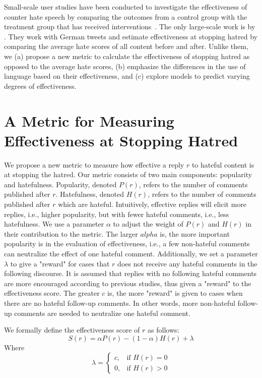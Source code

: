 \documentclass[11pt]{article}
\begin{document}
Small-scale user studies have been conducted to investigate the effectiveness of counter hate speech by comparing the outcomes from a control group with the treatment group that has received interventions~\cite{munger2017tweetment,hangartner2021empathy,bilewicz2021artificial}. 
The only large-scale work is by \citet{garland2022impact}.
They work with German tweets and estimate effectiveness at stopping hatred by comparing the 
average hate scores of all content before and after.
Unlike them, 
we 
(a) propose a new metric to calculate the effectiveness of stopping hatred as opposed to the average hate scores, 
(b) emphasize the differences in the use of language based on their effectiveness,
and
(c) explore models to predict varying degrees of effectiveness. 


\section{A Metric for Measuring Effectiveness at Stopping Hatred} %
\label{s:metric}
We propose a new metric to measure how effective a reply $r$ to hateful content is at stopping the hatred.
Our metric consists of two main components: popularity and hatefulness.
Popularity, denoted $P(r)$, refers to the number of comments published after $r$.
Hatefulness, denoted $H(r)$, refers to the number of comments published after $r$ which are hateful.
Intuitively, effective replies will elicit more replies, i.e., higher popularity, but with fewer hateful comments, i.e., less hatefulness.  
We use a parameter $\alpha$ to adjust the weight of $P(r)$ and $H(r)$ in their contribution to the metric. The larger $alpha$ is, the more important popularity is in the evaluation of effectiveness, i.e., a few non-hateful comments can neutralize the effect of one hateful comment. 
Additionally, we set a parameter $\lambda$ to give a "reward" for cases that $r$ does not receive any hateful comments in the following discourse. 
It is assumed that replies with no following hateful comments are more encouraged according to previous studies, thus given a "reward" to the effectiveness score. 
The greater $c$ is, the more "reward" is given to cases when there are no hateful follow-up comments. In other words, more non-hateful follow-up comments are needed to neutralize one hateful comment.

We formally define the effectiveness score of $r$ as follows:
$$S(r) = \alpha P(r) - (1-\alpha) H(r) + \lambda$$
Where
\[
\lambda =
\begin{cases}
	c, & \text{if } H(r) = 0\\
	0,              & \text{if } H(r) > 0
\end{cases}
\]
\end{document}
